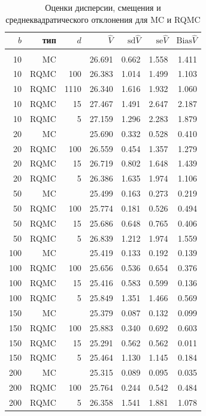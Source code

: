 \documentclass{article}
\newcommand{\Vhat}{\hat{V}}
\begin{document}
\begin{table}[hp]
\centering
\caption{Оценки дисперсии, смещения и среднеквадратического отклонения для MC и RQMC}\label{tbl:mc_rqmc}
\vspace{10pt}
\begin{tabular}{rrrrrrr}
$b$&тип&$d$&$\Vhat$&$\mathrm{sd}\Vhat$&$\mathrm{se}\Vhat$&$\mathrm{Bias}\Vhat$\\[5pt]\hline\\
10&MC&&26.691&0.662&1.558&1.411\\
10&RQMC&100&26.383&1.014&1.499&1.103\\
10&RQMC&1110&26.340&1.616&1.932&1.060\\
10&RQMC&15&27.467&1.491&2.647&2.187\\
10&RQMC&5&27.159&1.296&2.283&1.879\\[5pt]
20&MC&&25.690&0.332&0.528&0.410\\
20&RQMC&100&26.559&0.454&1.357&1.279\\
20&RQMC&15&26.719&0.802&1.648&1.439\\
20&RQMC&5&26.386&1.635&1.974&1.106\\[5pt]
50&MC&&25.499&0.163&0.273&0.219\\
50&RQMC&100&25.774&0.181&0.526&0.494\\
50&RQMC&15&25.686&0.648&0.765&0.406\\
50&RQMC&5&26.839&1.212&1.974&1.559\\[5pt]
100&MC&&25.419&0.133&0.192&0.139\\
100&RQMC&100&25.656&0.536&0.654&0.376\\
100&RQMC&15&25.416&0.583&0.599&0.136\\
100&RQMC&5&25.849&1.351&1.466&0.569\\[5pt]
150&MC&&25.379&0.087&0.132&0.099\\
150&RQMC&100&25.883&0.340&0.692&0.603\\
150&RQMC&15&25.291&0.562&0.562&0.011\\
150&RQMC&5&25.464&1.130&1.145&0.184\\[5pt]
200&MC&&25.315&0.089&0.095&0.035\\
200&RQMC&100&25.764&0.244&0.542&0.484\\
200&RQMC&5&26.358&1.541&1.881&1.078\\[5pt]
\end{tabular}
\end{table}
\end{document}

